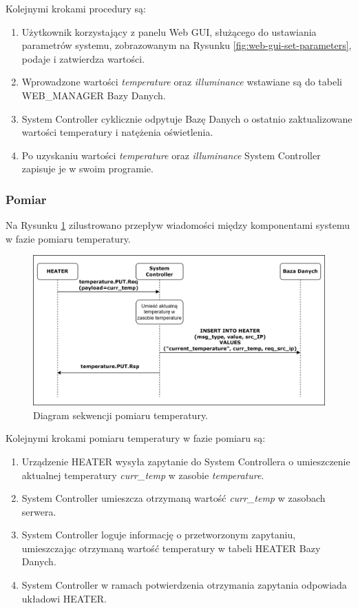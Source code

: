             Kolejnymi krokami procedury są:
            \begin{enumerate}
                \item Użytkownik korzystający z panelu Web GUI, służącego do ustawiania parametrów systemu, zobrazowanym na Rysunku \ref{fig:web-gui-set-parameters}, podaje i zatwierdza wartości.
                \item Wprowadzone wartości \textit{temperature} oraz \textit{illuminance} wstawiane są do tabeli WEB\_MANAGER Bazy Danych.
                \item System Controller cyklicznie odpytuje Bazę Danych o ostatnio zaktualizowane wartości temperatury i natężenia oświetlenia.
                \item Po uzyskaniu wartości \textit{temperature} oraz \textit{illuminance} System Controller zapisuje je w swoim programie.
            \end{enumerate}

        \subsubsection{Pomiar}

            Na Rysunku \ref{fig:seq-heater-measure} zilustrowano przepływ wiadomości między komponentami systemu w fazie pomiaru temperatury.

            \begin{figure}[H]
                \centering
                \includegraphics[width=0.8\linewidth]{graphics/sequence-diagrams/heater-measure-seq.png}
                \caption{Diagram sekwencji pomiaru temperatury.}
                \label{fig:seq-heater-measure}
            \end{figure}

            Kolejnymi krokami pomiaru temperatury w fazie pomiaru są:
            \begin{enumerate}
                \item Urządzenie HEATER wysyła zapytanie do System Controllera o umieszczenie aktualnej temperatury \textit{curr\_temp} w zasobie \textit{temperature}.
                \item System Controller umieszcza otrzymaną wartość \textit{curr\_temp} w zasobach serwera.
                \item System Controller loguje informację o przetworzonym zapytaniu, umieszczając otrzymaną wartość temperatury w tabeli HEATER Bazy Danych.
                \item System Controller w ramach potwierdzenia otrzymania zapytania odpowiada układowi HEATER.
            \end{enumerate}

